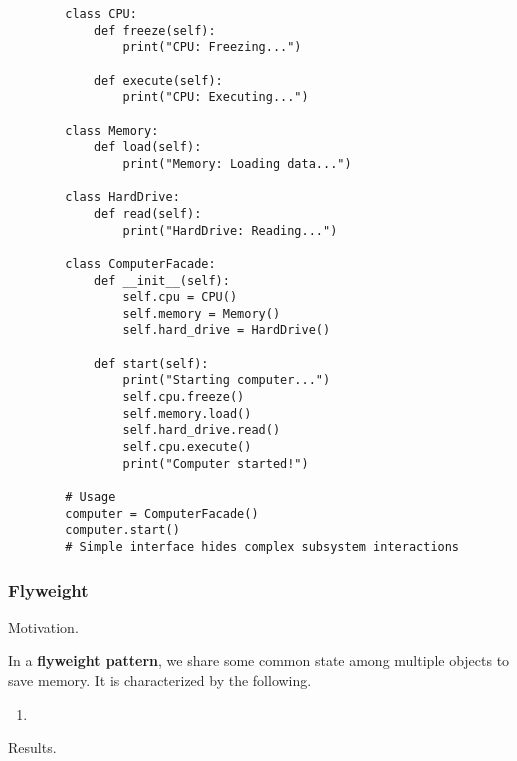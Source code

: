     \begin{example}
      \begin{lstlisting}
        class CPU:
            def freeze(self):
                print("CPU: Freezing...")
            
            def execute(self):
                print("CPU: Executing...")

        class Memory:
            def load(self):
                print("Memory: Loading data...")

        class HardDrive:
            def read(self):
                print("HardDrive: Reading...")

        class ComputerFacade:
            def __init__(self):
                self.cpu = CPU()
                self.memory = Memory()
                self.hard_drive = HardDrive()
            
            def start(self):
                print("Starting computer...")
                self.cpu.freeze()
                self.memory.load()
                self.hard_drive.read()
                self.cpu.execute()
                print("Computer started!")

        # Usage
        computer = ComputerFacade()
        computer.start()
        # Simple interface hides complex subsystem interactions 
      \end{lstlisting}
    \end{example}

  \subsubsection{Flyweight}

    Motivation. 

    \begin{definition}
      In a \textbf{flyweight pattern}, we share some common state among multiple objects to save memory. It is characterized by the following. 
      \begin{enumerate}
        \item 
      \end{enumerate}
    \end{definition}

    Results. 

